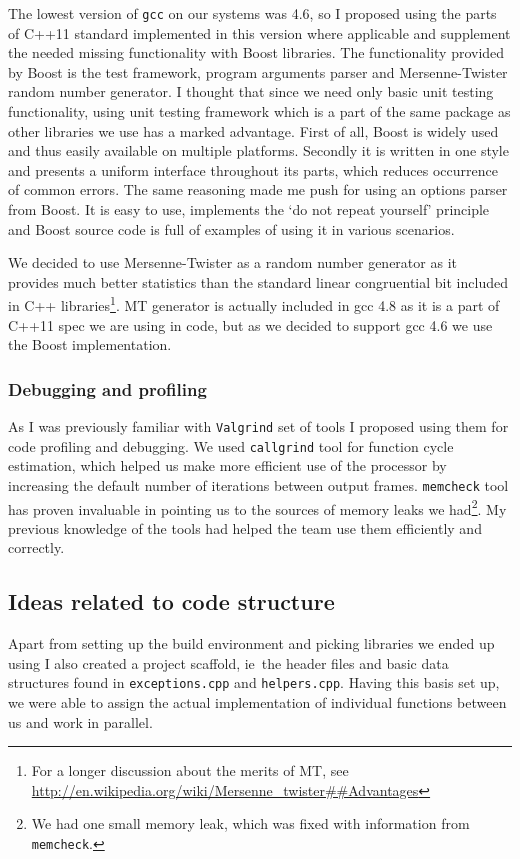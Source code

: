 \documentclass[11pt,a4paper]{article}
\begin{document}
The lowest version of \texttt{gcc} on our systems was 4.6, so I proposed using the parts of C++11 standard implemented in this version where applicable and supplement the needed missing functionality with Boost libraries. 
The functionality provided by Boost is the test framework, program arguments parser and Mersenne-Twister random number generator. I thought that since we need only basic unit testing functionality, using unit testing framework which is a part of the same package as other libraries we use has a marked advantage. First of all, Boost is widely used and thus easily available on multiple platforms. Secondly it is written in one style and presents a uniform interface throughout its parts, which reduces occurrence of common errors. 
The same reasoning made me push for using an options parser from Boost. It is easy to use, implements the `do not repeat yourself' principle and Boost source code is full of examples of using it in various scenarios. 

We decided to use Mersenne-Twister as a random number generator as it provides much better statistics than the standard linear congruential bit included in C++ libraries\footnote{For a longer discussion about the merits of MT, see \url{http://en.wikipedia.org/wiki/Mersenne_twister##Advantages}}. MT generator is actually included in gcc 4.8 as it is a part of C++11 spec we are using in code, but as we decided to support gcc 4.6 we use the Boost implementation.

\subsubsection{Debugging and profiling}

As I was previously familiar with \texttt{Valgrind} set of tools I proposed using them for code profiling and debugging. We used \texttt{callgrind} tool for function cycle estimation, which helped us make more efficient use of the processor by increasing the default number of iterations between output frames. \texttt{memcheck} tool has proven invaluable in pointing us to the sources of memory leaks we had\footnote{We had one small memory leak, which was fixed with information from \texttt{memcheck}.}. My previous knowledge of the tools had helped the team use them efficiently and correctly.

\subsection{Ideas related to code structure}\label{ideas}
Apart from setting up the build environment and picking libraries we ended up using I also created a project scaffold, ie\  the header files and basic data structures found in \texttt{exceptions.cpp} and \texttt{helpers.cpp}. Having this basis set up, we were able to assign the actual implementation of individual functions between us and work in parallel. 
\end{document}
